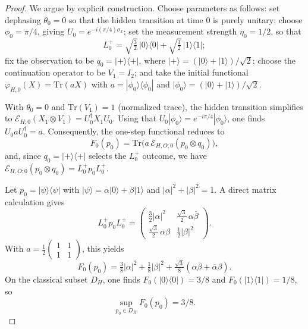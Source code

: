 \documentclass[10pt,a4paper]{amsart}
\begin{document}
\begin{proof}
We argue by explicit construction. Choose parameters as follows: set dephasing \(\theta_0 = 0\) so that the hidden transition at time \(0\) is purely unitary; choose \(\phi_0 = \pi/4\), giving \(U_0 = e^{-i(\pi/4)\sigma_x}\); set the measurement strength \(\eta_0 = 1/2\), so that
\[
L_0^{+} = \sqrt{\tfrac{3}{2}}\,|0\rangle\langle0| + \sqrt{\tfrac{1}{2}}\,|1\rangle\langle1|;
\]
fix the observation to be \(q_0 = |+\rangle\langle+|\), where \(|+\rangle = (|0\rangle+|1\rangle)/\sqrt2\); choose the continuation operator to be \(V_1 =  I_2\); and take the initial functional \(\varphi_{H,0}(X) = \mathrm{Tr}(aX)\) with \(a = |\phi_0\rangle\langle\phi_0|\) and \(|\phi_0\rangle = (|0\rangle+|1\rangle)/\sqrt2\).

With \(\theta_0=0\) and \(\mathrm{Tr}(V_1)=1\) (normalized trace), the hidden transition simplifies to \(\mathcal{E}_{H;0}(X_1\otimes V_1) = U_0^\dagger X_1 U_0\). Using that \(U_0|\phi_0\rangle = e^{-i\pi/4}|\phi_0\rangle\), one finds \(U_0 a U_0^\dagger = a\). Consequently, the one-step functional reduces to
\[
F_0(p_0) = \mathrm{Tr}\bigl(a\,\mathcal{E}_{H,O;0}(p_0\otimes q_0)\bigr),
\]
and, since \(q_0 = |+\rangle\langle+|\) selects the \(L_0^{+}\) outcome, we have \(\mathcal{E}_{H,O;0}(p_0\otimes q_0) = L_0^{+} p_0 L_0^{+}\).

Let \(p_0 = |\psi\rangle\langle\psi|\) with \(|\psi\rangle = \alpha|0\rangle + \beta|1\rangle\) and \(|\alpha|^2+|\beta|^2=1\). A direct matrix calculation gives
\[
L_0^{+} p_0 L_0^{+}
  =
  \begin{pmatrix}
    \tfrac{3}{2}|\alpha|^2 & \tfrac{\sqrt{3}}{2}\,\alpha\overline{\beta} \\
    \tfrac{\sqrt{3}}{2}\,\overline{\alpha}\beta & \tfrac{1}{2}|\beta|^2
  \end{pmatrix}.
\]
With \(a = \tfrac12\begin{pmatrix}1&1\\[2pt]1&1\end{pmatrix}\), this yields
\[
F_0(p_0)
  = \tfrac{3}{8}|\alpha|^2 + \tfrac{1}{8}|\beta|^2
    + \tfrac{\sqrt{3}}{8}(\alpha\overline{\beta} + \overline{\alpha}\beta).
\]
On the classical subset \(D_H\), one finds \(F_0(|0\rangle\langle0|) = 3/8\) and \(F_0(|1\rangle\langle1|) = 1/8\), so
\[
\sup_{p_0\in D_H} F_0(p_0) = 3/8.
\]


\end{proof}
\end{document}
